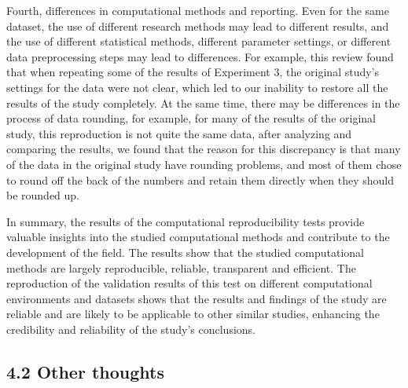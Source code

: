\documentclass[
  man,floatsintext]{apa6}
\begin{document}
Fourth, differences in computational methods and reporting. Even for the same dataset, the use of different research methods may lead to different results, and the use of different statistical methods, different parameter settings, or different data preprocessing steps may lead to differences. For example, this review found that when repeating some of the results of Experiment 3, the original study's settings for the data were not clear, which led to our inability to restore all the results of the study completely. At the same time, there may be differences in the process of data rounding, for example, for many of the results of the original study, this reproduction is not quite the same data, after analyzing and comparing the results, we found that the reason for this discrepancy is that many of the data in the original study have rounding problems, and most of them chose to round off the back of the numbers and retain them directly when they should be rounded up.

In summary, the results of the computational reproducibility tests provide valuable insights into the studied computational methods and contribute to the development of the field. The results show that the studied computational methods are largely reproducible, reliable, transparent and efficient. The reproduction of the validation results of this test on different computational environments and datasets shows that the results and findings of the study are reliable and are likely to be applicable to other similar studies, enhancing the credibility and reliability of the study's conclusions.

\subsection{4.2 Other thoughts}\label{other-thoughts}
\end{document}
